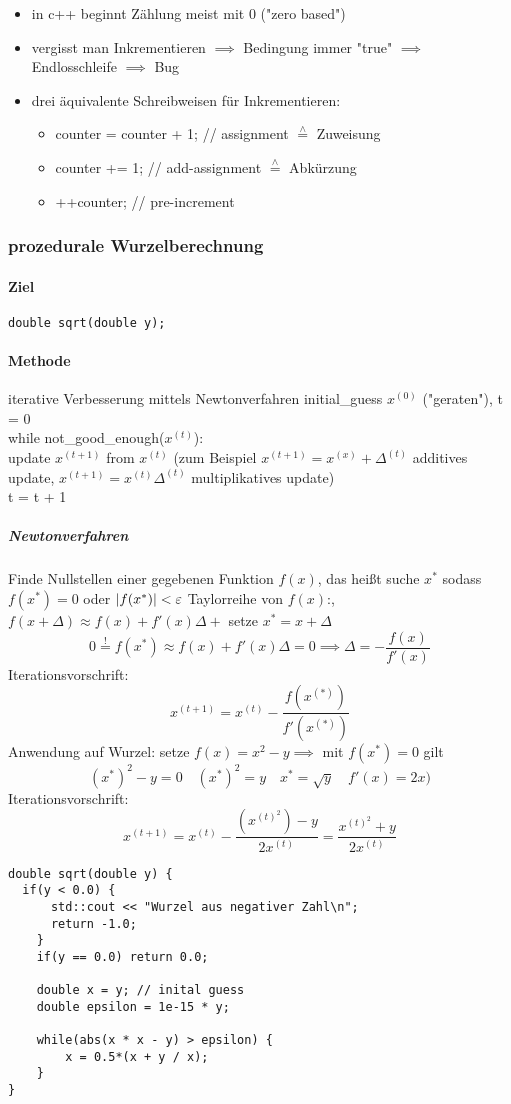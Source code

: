 \documentclass[a4paper]{scrartcl}
\newcommand{\estimates}{\overset{\scriptscriptstyle\wedge}{=}}%
\DeclarePairedDelimiter\abs{\lvert}{\rvert}%
\theoremstyle{definition}
\theoremstyle{plain}
\theoremstyle{remark}
\theoremstyle{remark}
\begin{document}
\begin{itemize}
\item in c++ beginnt Zählung meist mit $0$ ("zero based")
\item vergisst man Inkrementieren $\implies$ Bedingung immer "true" $\implies$ Endlosschleife $\implies$ Bug
\item drei äquivalente Schreibweisen für Inkrementieren:
\begin{itemize}
\item counter = counter + 1; // assignment $\estimates$ Zuweisung
\item counter += 1;          // add-assignment $\estimates$ Abkürzung
\item ++counter;             // pre-increment
\end{itemize}
\end{itemize}
\subsubsection{prozedurale Wurzelberechnung}
\label{sec-7-2-5}
\paragraph{Ziel}
\label{sec-7-2-5-1}
\begin{verbatim}
double sqrt(double y);
\end{verbatim}
\paragraph{Methode}
\label{sec-7-2-5-2}
iterative Verbesserung mittels Newtonverfahren
initial\_guess $x^{(0)}$ ("geraten"), t = 0 \\
         while not\_good\_enough($x^{(t)}$): \\
                 update $x^{(t + 1)}$ from $x^{(t)}$ (zum Beispiel $x^{(t + 1)} = x^{(x)} + \Delta^{(t)}$ additives update, $x^{(t + 1)} = x^{(t)}\Delta^{(t)}$ multiplikatives update) \\
                 t = t + 1 \\
\subparagraph{Newtonverfahren}
\label{sec-7-2-5-2-1}
Finde Nullstellen einer gegebenen Funktion $f(x)$, das heißt suche $x^\ast$ sodass $f(x^\ast) = 0$ oder $\abs{f(x^\ast)} < \varepsilon$
Taylorreihe von $f(x)$:, $f(x + \Delta) \approx f(x) + f'(x)\Delta +$ setze $x^\ast = x + \Delta$
\[0 \overset{!}{=} f(x^\ast) \approx f(x) + f'(x)\Delta = 0 \implies \Delta = - \frac{f(x)}{f'(x)}\]
Iterationsvorschrift:
\[x^{(t + 1)} = x^{(t)} - \frac{f(x^{(\ast)})}{f'(x^{(\ast)})}\]
Anwendung auf Wurzel: setze $f(x) = x^2 - y \implies$ mit $f(x^\ast) = 0$ gilt
\[(x^\ast)^2 -y = 0 \quad (x^\ast)^2 = y \quad x^\ast = \sqrt{y}\quad f'(x) = 2x)\]
Iterationsvorschrift:
\[x^{(t + 1)} = x^{(t)} - \frac{(x^{(t)^2}) - y}{2x^{(t)}} = \frac{x^{(t)^2} + y}{2x^{(t)}}\]
\begin{verbatim}
double sqrt(double y) {
  if(y < 0.0) {
	  std::cout << "Wurzel aus negativer Zahl\n";
	  return -1.0;
	}
	if(y == 0.0) return 0.0;

	double x = y; // inital guess
	double epsilon = 1e-15 * y;

	while(abs(x * x - y) > epsilon) {
		x = 0.5*(x + y / x);
	}
}
\end{verbatim}
\end{document}
